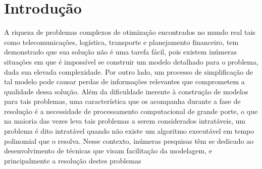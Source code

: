 \chapter{Introdução}
\label{Cap:introducao}

A riqueza de problemas complexos de otimização encontrados no mundo real tais como telecomunicações, logística, transporte e planejamento financeiro, tem demonstrado que sua solução não é uma tarefa fácil, pois existem inúmeras situações em que é impossível se construir um modelo detalhado para o problema, dada sua elevada complexidade. Por outro lado, um processo de simplificação de tal modelo pode causar perdas de informações relevantes que comprometem  a qualidade dessa solução. Além da dificuldade inerente à construção de modelos para tais problemas, uma  característica que os acompanha durante a fase de resolução é a necessidade de processamento computacional de grande porte, o que na maioria das vezes leva tais problemas a serem considerados intratáveis, um problema é dito intratável quando não existe um algoritmo executável em tempo polinomial que o resolva. Nesse contexto, inúmeras pesquisas têm se dedicado ao desenvolvimento de técnicas que visam facilitação da modelagem, e principalmente a resolução destes  problemas 
